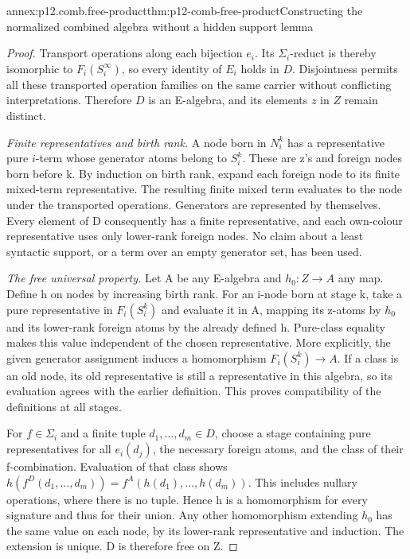 \begin{annexitem}{annex:p12.comb.free-product}{thm:p12-comb-free-product}{Constructing the normalized combined algebra without a hidden support lemma}
\begin{proof}
Transport operations along each bijection \(e_i\). Its \(\Sigma_i\)-reduct
is thereby isomorphic to \(F_i(S_i^\infty)\), so every identity of
\(E_i\) holds in \(D\). Disjointness permits all these transported operation
families on the same carrier without conflicting interpretations.
Therefore \(D\) is an E-algebra, and its elements \(z\) in \(Z\) remain distinct.

\emph{Finite representatives and birth rank.} A node born in
\(N_i^k\) has a representative pure \(i\)-term whose generator atoms
belong to \(S_i^k\). These are z's and foreign nodes born before
k. By induction on birth rank, expand each foreign node to its
finite mixed-term representative. The resulting finite mixed term
evaluates to the node under the transported operations. Generators
are represented by themselves. Every element of D consequently has
a finite representative, and each own-colour representative uses
only lower-rank foreign nodes. No claim about a least syntactic
support, or a term over an empty generator set, has been used.

\emph{The free universal property.} Let A be any E-algebra and
\(h_0:Z\to A\) any map. Define h on nodes by increasing birth rank.
For an i-node born at stage k, take a pure representative in
\(F_i(S_i^k)\) and evaluate it in A, mapping its z-atoms by
\(h_0\) and its lower-rank foreign atoms by the already defined h.
Pure-class equality makes this value independent of the chosen
representative. More explicitly, the given generator assignment
induces a homomorphism \(F_i(S_i^k)\to A\). If a class is an old
node, its old representative is still a representative in this
algebra, so its evaluation agrees with the earlier definition.
This proves compatibility of the definitions at all stages.

For \(f\in\Sigma_i\) and a finite tuple \(d_1,\ldots,d_m\in D\),
choose a stage containing pure representatives for all
\(e_i(d_j)\), the necessary foreign atoms, and the class of their
f-combination. Evaluation of that class shows
\(h(f^D(d_1,\ldots,d_m))=f^A(h(d_1),\ldots,h(d_m))\).
This includes nullary operations, where there is no tuple.
Hence h is a homomorphism for every signature and thus for their
union. Any other homomorphism extending \(h_0\) has the same
value on each node, by its lower-rank representative and induction.
The extension is unique. D is therefore free on Z.


\end{proof}
\end{annexitem}
